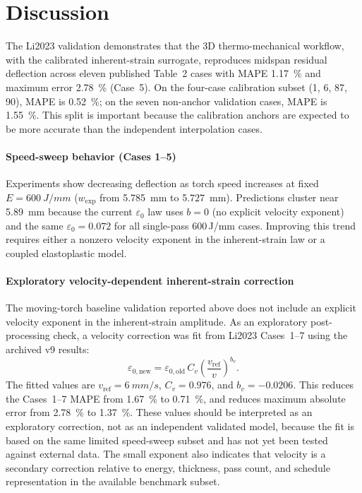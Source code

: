 \section{Discussion}
\label{sec:discussion}

The Li2023 validation demonstrates that the 3D thermo-mechanical workflow, with the calibrated inherent-strain surrogate, reproduces midspan residual deflection across eleven published Table~2 cases with MAPE \SI{1.17}{\%} and maximum error \SI{2.78}{\%} (Case~5). On the four-case calibration subset (1, 6, 87, 90), MAPE is \SI{0.52}{\%}; on the seven non-anchor validation cases, MAPE is \SI{1.55}{\%}. This split is important because the calibration anchors are expected to be more accurate than the independent interpolation cases.

\paragraph{Speed-sweep behavior (Cases 1--5)}
Experiments show decreasing deflection as torch speed increases at fixed $E=\SI{600}{J/mm}$ ($w_{\mathrm{exp}}$ from \SI{5.785}{mm} to \SI{5.727}{mm}). Predictions cluster near \SI{5.89}{mm} because the current $\varepsilon_0$ law uses $b=0$ (no explicit velocity exponent) and the same $\varepsilon_0=0.072$ for all single-pass 600\,J/mm cases. Improving this trend requires either a nonzero velocity exponent in the inherent-strain law or a coupled elastoplastic model.

\paragraph{Exploratory velocity-dependent inherent-strain correction}
The moving-torch baseline validation reported above does not include an explicit velocity exponent in the inherent-strain amplitude. As an exploratory post-processing check, a velocity correction was fit from Li2023 Cases~1--7 using the archived v9 results:
\begin{equation}
\varepsilon_{0,\mathrm{new}} =
\varepsilon_{0,\mathrm{old}}\,
C_v\left(\frac{v_{\mathrm{ref}}}{v}\right)^{b_v}.
\end{equation}
The fitted values are $v_{\mathrm{ref}}=\SI{6}{mm/s}$, $C_v=0.976$, and $b_v=-0.0206$. This reduces the Cases~1--7 MAPE from \SI{1.67}{\%} to \SI{0.71}{\%}, and reduces maximum absolute error from \SI{2.78}{\%} to \SI{1.37}{\%}. These values should be interpreted as an exploratory correction, not as an independent validated model, because the fit is based on the same limited speed-sweep subset and has not yet been tested against external data. The small exponent also indicates that velocity is a secondary correction relative to energy, thickness, pass count, and schedule representation in the available benchmark subset.

